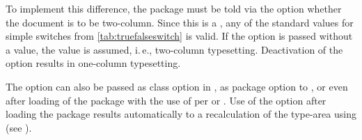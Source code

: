 To implement this difference, the  package must be
told via the  option whether the document is to be
two-column. Since this is a , any of the standard values
for simple switches from \autoref{tab:truefalseswitch} is valid. If
the option is passed without a value, the value  is
assumed, i.\,e., two-column typesetting. Deactivation of the option
results in one-column typesetting.

The option can also be passed as class option in
, as package option to , or
even after loading of the  package with the use of
per  or . Use of the option after
loading the  package results automatically to a
recalculation of the type-area using  (see
).%
%


